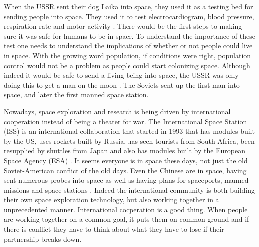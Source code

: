 \documentclass[a4paper,12pt]{article}
\begin{document}
When the USSR sent their dog Laika into space, they used it as a testing bed for sending people into space. They used it to test electrocardiogram, blood pressure, respiration rate and motor activity \autocite{west2001}. There would be the first steps to making sure it was safe for humans to be in space. To understand the importance of these test one needs to understand the implications of whether or not people could live in space. With the growing word population, if conditions were right, population control would not be a problem as people could start colonizing space. Although indeed it would be safe to send a living being into space, the USSR was only doing this to get a man on the moon \autocite{west2001}. The Soviets sent up the first man into space, and later the first manned space station.

Nowadays, space exploration and research is being driven by international cooperation instead of being a theater for war. The International Space Station (ISS) is an international collaboration that started in 1993 that has modules built by the US, uses rockets built by Russia, has seen tourists from South Africa, been resupplied by shuttles from Japan and also has modules built by the European Space Agency (ESA) \autocite{funk2014}. It seems everyone is in space these days, not just the old Soviet-American conflict of the old days. Even the Chinese are in space, having sent numerous probes into space as well as having plans for spaceports, manned missions and space stations \autocite{jolly2013}. Indeed the international community is both building their own space exploration technology, but also working together in a unprecedented manner. International cooperation is a good thing. When people are working together on a common goal, it puts them on common ground and if there is conflict they have to think about what they have to lose if their partnership breaks down. 
\end{document}
